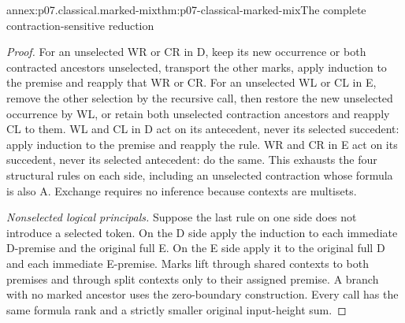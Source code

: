 \begin{annexitem}{annex:p07.classical.marked-mix}{thm:p07-classical-marked-mix}{The complete contraction-sensitive reduction}
\begin{proof}
For an unselected WR or CR in D, keep its new occurrence or both
contracted ancestors unselected, transport the other marks, apply
induction to the premise and reapply that WR or CR. For an unselected
WL or CL in E, remove the other selection by the recursive call, then
restore the new unselected occurrence by WL, or retain both unselected
contraction ancestors and reapply CL to them.
WL and CL in D act on its antecedent, never its selected succedent:
apply induction to the premise and reapply the rule. WR and CR in E
act on its succedent, never its selected antecedent: do the same.
This exhausts the four structural rules on each side, including an
unselected contraction whose formula is also A. Exchange requires no
inference because contexts are multisets.

\emph{Nonselected logical principals.}
Suppose the last rule on one side does not introduce a selected token.
On the D side apply the induction to each immediate D-premise and the
original full E. On the E side apply it to the original full D and each
immediate E-premise. Marks lift through shared contexts to both premises
and through split contexts only to their assigned premise. A branch with
no marked ancestor uses the zero-boundary construction. Every call has
the same formula rank and a strictly smaller original input-height sum.


\end{proof}
\end{annexitem}
